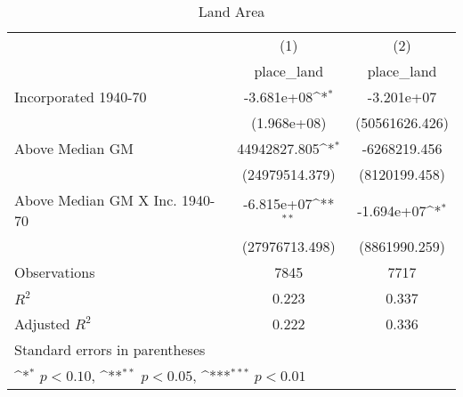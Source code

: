 \begin{table}[htbp]\centering
\def\sym#1{\ifmmode^{#1}\else\(^{#1}\)\fi}
\caption{Land Area}
\begin{tabular}{l*{2}{c}}
\hline\hline
                    &\multicolumn{1}{c}{(1)}&\multicolumn{1}{c}{(2)}\\
                    &\multicolumn{1}{c}{place\_land}&\multicolumn{1}{c}{place\_land}\\
\hline
Incorporated 1940-70&  -3.681e+08\sym{*}  &  -3.201e+07         \\
                    & (1.968e+08)         &(50561626.426)         \\
[1em]
Above Median GM     &44942827.805\sym{*}  &-6268219.456         \\
                    &(24979514.379)         &(8120199.458)         \\
[1em]
Above Median GM X Inc. 1940-70&  -6.815e+07\sym{**} &  -1.694e+07\sym{*}  \\
                    &(27976713.498)         &(8861990.259)         \\
\hline
Observations        &        7845         &        7717         \\
\(R^{2}\)           &       0.223         &       0.337         \\
Adjusted \(R^{2}\)  &       0.222         &       0.336         \\
\hline\hline
\multicolumn{3}{l}{\footnotesize Standard errors in parentheses}\\
\multicolumn{3}{l}{\footnotesize \sym{*} \(p<0.10\), \sym{**} \(p<0.05\), \sym{***} \(p<0.01\)}\\
\end{tabular}
\end{table}
